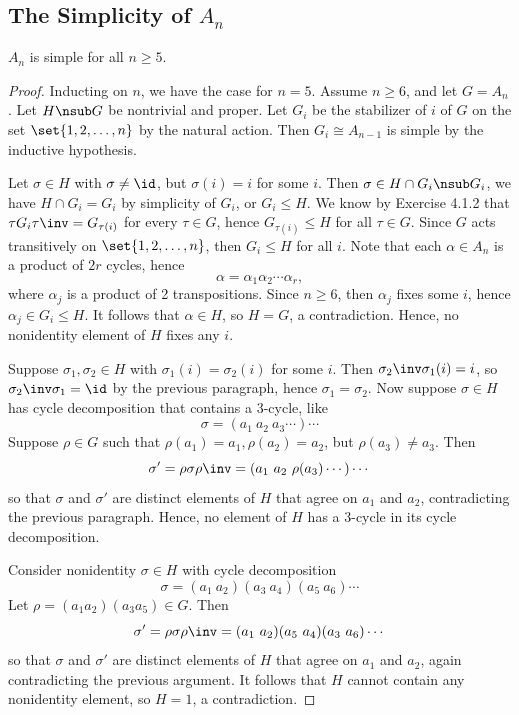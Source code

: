 \newpage

\subsection{\texorpdfstring{The Simplicity of $A_n$}{The Simplicity of An}} \label{sec4.6}

\theo[Simplicity of $A_n$] \label{theo4.24}
$A_n$ is simple for all $n \geq 5$.

\begin{proof}
    Inducting on $n$, we have the case for $n = 5$. Assume $n \geq 6$, and let $G = A_n$. Let $H \nsub G$ be nontrivial and proper. Let $G_i$ be the stabilizer of $i$ of $G$ on the set $\set{1, 2, \ldots, n}$ by the natural action. Then $G_i \cong A_{n - 1}$ is simple by the inductive hypothesis. 

    Let $\sigma \in H$ with $\sigma \neq \id$, but $\sigma(i) = i$ for some $i$. Then $\sigma \in H \cap G_i \nsub G_i$, we have $H \cap G_i = G_i$ by simplicity of $G_i$, or $G_i \leq H$. We know by Exercise 4.1.2 that $\tau G_i\tau\inv = G_{\tau(i)}$ for every $\tau \in G$, hence $G_{\tau(i)} \leq H$ for all $\tau \in G$. Since $G$ acts transitively on $\set{1, 2, \ldots, n}$, then $G_i \leq H$ for all $i$. Note that each $\alpha \in A_n$ is a product of $2r$ cycles, hence
    \[\alpha = \alpha_1\alpha_2 \cdots \alpha_r,\]
    where $\alpha_j$ is a product of 2 transpositions. Since $n \geq 6$, then $\alpha_j$ fixes some $i$, hence $\alpha_j \in G_i \leq H$. It follows that $\alpha \in H$, so $H = G$, a contradiction. Hence, no nonidentity element of $H$ fixes any $i$.

    Suppose $\sigma_1, \sigma_2 \in H$ with $\sigma_1(i) = \sigma_2(i)$ for some $i$. Then $\sigma_2\inv\sigma_1(i) = i$, so $\sigma_2\inv\sigma_1 = \id$ by the previous paragraph, hence $\sigma_1 = \sigma_2$. Now suppose $\sigma \in H$ has cycle decomposition that contains a 3-cycle, like
    \[\sigma = (a_1\ a_2\ a_3 \cdots) \cdots\]
    Suppose $\rho \in G$ such that $\rho(a_1) = a_1, \rho(a_2) = a_2$, but $\rho(a_3) \neq a_3$. Then
    \[\sigma' = \rho\sigma\rho\inv = (a_1\ a_2\ \rho(a_3) \cdots) \cdots\]
    so that $\sigma$ and $\sigma'$ are distinct elements of $H$ that agree on $a_1$ and $a_2$, contradicting the previous paragraph. Hence, no element of $H$ has a 3-cycle in its cycle decomposition.

    Consider nonidentity $\sigma \in H$ with cycle decomposition
    \[\sigma = (a_1\ a_2)(a_3\ a_4)(a_5\ a_6) \cdots\]
    Let $\rho = (a_1 a_2)(a_3 a_5) \in G$. Then
    \[\sigma' = \rho\sigma\rho\inv = (a_1\ a_2)(a_5\ a_4)(a_3\ a_6) \cdots\]
    so that $\sigma$ and $\sigma'$ are distinct elements of $H$ that agree on $a_1$ and $a_2$, again contradicting the previous argument. It follows that $H$ cannot contain any nonidentity element, so $H = 1$, a contradiction.
\end{proof} 